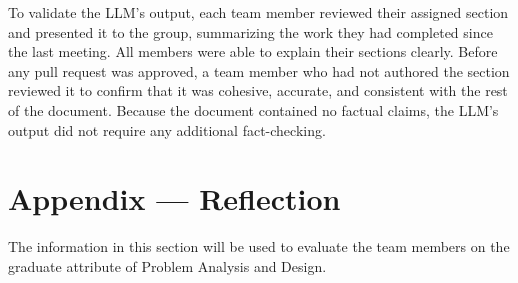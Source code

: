 \documentclass[12pt, titlepage]{article}
\begin{document}
To validate the LLM's output, each team member reviewed their assigned section and presented it to the group, summarizing the work they had completed since the last meeting.
All members were able to explain their sections clearly.
Before any pull request was approved, a team member who had not authored the section reviewed it to confirm that it was cohesive, accurate, and consistent with the rest of the document.
Because the document contained no factual claims, the LLM's output did not require any additional fact-checking.

\newpage{}

\section{Appendix --- Reflection}

The information in this section will be used to evaluate the team members on the
graduate attribute of Problem Analysis and Design.


\end{document}
